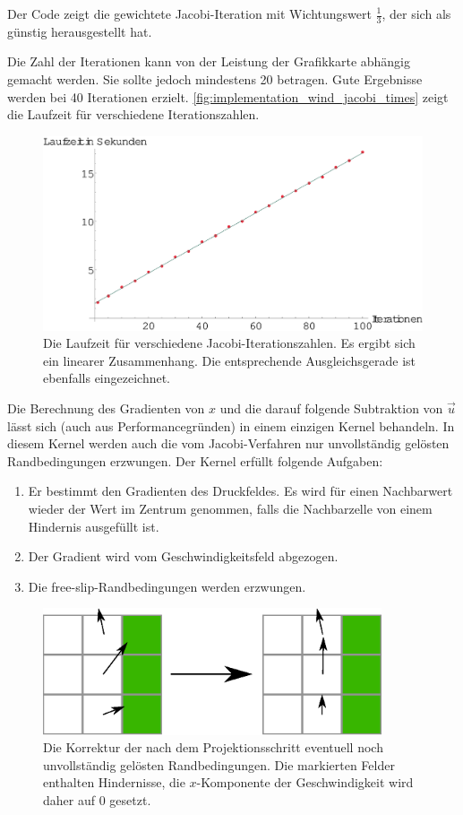 Der Code zeigt die gewichtete Jacobi-Iteration mit Wichtungswert
$\frac{1}{3}$, der sich als günstig herausgestellt hat.

Die Zahl der Iterationen kann von der Leistung der Grafikkarte
abhängig gemacht werden. Sie sollte jedoch mindestens 20
betragen. Gute Ergebnisse werden bei 40 Iterationen
erzielt. \autoref{fig:implementation_wind_jacobi_times} zeigt die
Laufzeit für verschiedene Iterationszahlen.

\begin{figure}[ht]
\centering
\includegraphics[width=13cm]{images/jacobi_times}
\caption{Die Laufzeit für verschiedene Jacobi-Iterationszahlen. Es ergibt sich ein linearer Zusammenhang. Die entsprechende Ausgleichsgerade ist ebenfalls eingezeichnet.}
\label{fig:implementation_wind_jacobi_times}
\end{figure}

Die Berechnung des Gradienten von $x$ und die darauf folgende
Subtraktion von $\vec{u}$ lässt sich (auch aus Performancegründen) in
einem einzigen Kernel behandeln. In diesem Kernel werden auch die vom
Jacobi-Verfahren nur unvollständig gelösten Randbedingungen
erzwungen. Der Kernel erfüllt folgende Aufgaben:

\begin{enumerate}
\item Er bestimmt den Gradienten des Druckfeldes. Es wird für einen
Nachbarwert wieder der Wert im Zentrum genommen, falls die
Nachbarzelle von einem Hindernis ausgefüllt ist.
\item Der Gradient wird vom Geschwindigkeitsfeld abgezogen.
\item Die free-slip-Randbedingungen werden erzwungen.
\end{enumerate}

\begin{figure}[h]
\centering
\includegraphics[width=10cm]{images/force_free_slip}
\caption{Die Korrektur der nach dem Projektionsschritt eventuell noch unvollständig gelösten Randbedingungen. Die markierten Felder enthalten Hindernisse, die $x$-Komponente der Geschwindigkeit wird daher auf $0$ gesetzt.}
\label{fig:implementation_wind_enforce_free_slip}
\end{figure}

